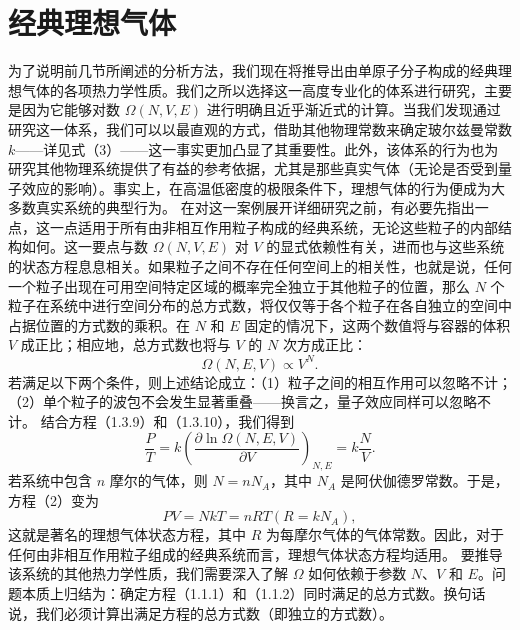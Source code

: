\section{经典理想气体}\label{ux7ecfux5178ux7406ux60f3ux6c14ux4f53}
为了说明前几节所阐述的分析方法，我们现在将推导出由单原子分子构成的经典理想气体的各项热力学性质。我们之所以选择这一高度专业化的体系进行研究，主要是因为它能够对数 \(\Omega(N,V,E)\) 进行明确且近乎渐近式的计算。当我们发现通过研究这一体系，我们可以以最直观的方式，借助其他物理常数来确定玻尔兹曼常数 \(k\)——详见式（3）——这一事实更加凸显了其重要性。此外，该体系的行为也为研究其他物理系统提供了有益的参考依据，尤其是那些真实气体（无论是否受到量子效应的影响）。事实上，在高温低密度的极限条件下，理想气体的行为便成为大多数真实系统的典型行为。
在对这一案例展开详细研究之前，有必要先指出一点，这一点适用于所有由非相互作用粒子构成的经典系统，无论这些粒子的内部结构如何。这一要点与数 \(\Omega(N,V,E)\) 对 \(V\) 的显式依赖性有关，进而也与这些系统的状态方程息息相关。如果粒子之间不存在任何空间上的相关性，也就是说，任何一个粒子出现在可用空间特定区域的概率完全独立于其他粒子的位置，那么 \(N\) 个粒子在系统中进行空间分布的总方式数，将仅仅等于各个粒子在各自独立的空间中占据位置的方式数的乘积。在 \(N\) 和 \(E\) 固定的情况下，这两个数值将与容器的体积 \(V\) 成正比；相应地，总方式数也将与 \(V\) 的 \(N\) 次方成正比：
\begin{equation}\tag{1.3.20}\label{eq:1.3.20}
\Omega ( N , E , V ) \propto V ^{N} .
\end{equation}
若满足以下两个条件，则上述结论成立：（1）粒子之间的相互作用可以忽略不计；（2）单个粒子的波包不会发生显著重叠——换言之，量子效应同样可以忽略不计。
结合方程（1.3.9）和（1.3.10），我们得到
\begin{equation}\tag{1.3.21}\label{eq:1.3.21}
\frac { P } { T } = k \left( \frac { \partial \ln \Omega ( N , E , V ) } { \partial V } \right) _ { N , E } = k \frac { N } { V } .
\end{equation}
若系统中包含 \(n\) 摩尔的气体，则 \(N = nN_A\)，其中 \(N_A\) 是阿伏伽德罗常数。于是，方程（2）变为
\begin{equation}\tag{1.3.22}\label{eq:1.3.22}
P V = N k T = n R T  ( R = k N _ { A } ) ,
\end{equation}
这就是著名的理想气体状态方程，其中 \(R\) 为每摩尔气体的气体常数。因此，对于任何由非相互作用粒子组成的经典系统而言，理想气体状态方程均适用。
要推导该系统的其他热力学性质，我们需要深入了解 \(\Omega\) 如何依赖于参数 \(N\)、\(V\) 和 \(E\)。问题本质上归结为：确定方程（1.1.1）和（1.1.2）同时满足的总方式数。换句话说，我们必须计算出满足方程的总方式数（即独立的方式数）。

